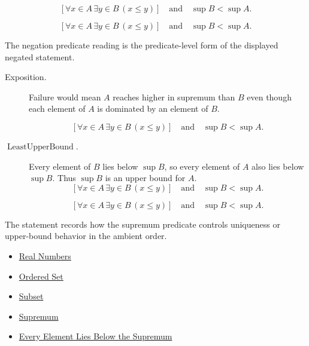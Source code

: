 \begin{remark*}
\[
  [\forall x\in A\,\exists y\in B\,(x\leq y)]
  \quad\text{and}\quad
  \sup B<\sup A.
\]
\end{remark*}

\begin{remark*}
\[
  [\forall x\in A\,\exists y\in B\,(x\leq y)]
  \quad\text{and}\quad
  \sup B<\sup A.
\]

The negation predicate reading is the predicate-level form of the displayed negated statement.
\end{remark*}

\begin{remark*}
\begin{description}
  \item[Exposition.]
  Failure would mean $A$ reaches higher in supremum than $B$ even though
  each element of $A$ is dominated by an element of $B$.

  
\[
[\forall x\in A\,\exists y\in B\,(x\leq y)]
  \quad\text{and}\quad
  \sup B<\sup A.
\]
  \item[\(\operatorname{LeastUpperBound}.\)]
  Every element of $B$ lies below $\sup B$, so every element of $A$ also
  lies below $\sup B$.  Thus $\sup B$ is an upper bound for $A$.
  \[
    [\forall x\in A\,\exists y\in B\,(x\leq y)]
    \quad\text{and}\quad
    \sup B<\sup A.
  \]

\[
    [\forall x\in A\,\exists y\in B\,(x\leq y)]
    \quad\text{and}\quad
    \sup B<\sup A.
  \]
\end{description}
\end{remark*}

\begin{remark*}[Interpretation]
The statement records how the supremum predicate controls uniqueness or upper-bound behavior in the ambient order.
\end{remark*}

\begin{dependencies}
\begin{itemize}
  \item \hyperref[def:reals]{Real Numbers}
  \item \hyperref[def:ordered-set]{Ordered Set}
  \item \hyperref[def:subset]{Subset}
  \item \hyperref[def:supremum]{Supremum}
  \item \hyperref[prop:every-element-lies-below-the-supremum]{Every Element Lies Below the Supremum}
\end{itemize}
\end{dependencies}


